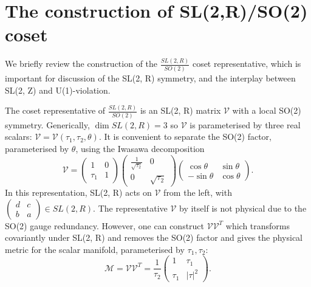 \section{The construction of SL(2,R)/SO(2) coset}

We briefly review the construction of the $\frac{SL(2, R)}{SO(2)}$ coset representative, which is important for discussion of the SL(2, R) symmetry, and the interplay between SL(2, Z) and U(1)-violation.

The coset representative of $\frac{SL(2, R)}{SO(2)}$ is an SL(2, R) matrix $\mathcal{V}$ with a local SO(2) symmetry. 
Generically, $\dim SL(2, R) = 3$ so $\mathcal{V}$ is parameterised by three real scalars: $\mathcal{V} = \mathcal{V}(\tau_1, \tau_2, \theta)$.
It is convenient to separate the SO(2) factor, parameterised by $\theta$, using the Iwasawa decomposition \cite{iwasawa1949}
\begin{equation}
\mathcal{V} = 
\begin{pmatrix}
1 & 0 \\
\tau_1 & 1
\end{pmatrix}
\begin{pmatrix}
\frac{1}{\sqrt{\tau_2}} & 0\\
0 & \sqrt{\tau_2}
\end{pmatrix}
\begin{pmatrix}
\cos\theta & \sin\theta\\
-\sin\theta & \cos\theta
\end{pmatrix}.
\label{Iwasawa-decomposition}
\end{equation}
In this representation, SL(2, R) acts on $\mathcal{V}$ from the left, with $\begin{pmatrix}
d&c\\b&a\end{pmatrix} \in SL(2, R)$.
The representative $\mathcal{V}$ by itself is not physical due to the SO(2) gauge redundancy.
However, one can construct $\mathcal{V}\mathcal{V}^T$ which transforms covariantly under SL(2, R) and removes the SO(2) factor and gives the physical metric for the scalar manifold, parameterised by $\tau_1, \tau_2$:
\begin{equation}
\mathcal{M} = \mathcal{V}\mathcal{V}^T = \frac{1}{\tau_2}\begin{pmatrix}
1 & \tau_1\\
\tau_1 & |\tau|^2
\end{pmatrix}.
\end{equation}


